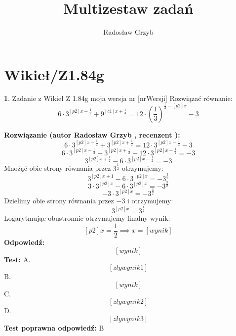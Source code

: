 \documentclass[12pt, a4paper]{article}
\title{Multizestaw zadań}
\author{Radosław Grzyb}
\date{}
\theoremstyle{definition} %
\newtheorem{zad}{}
\newcommand{\kategoria}[1]{\section{#1}} %
\newcommand{\zadStart}[1]{\begin{zad}#1\newline} %
\newcommand{\zadStop}{\end{zad}}   %
\newcommand{\rozwStart}[2]{\noindent \textbf{Rozwiązanie (autor #1 , recenzent #2): }\newline} %
\newcommand{\rozwStop}{\newline}                                            %
\newcommand{\odpStart}{\noindent \textbf{Odpowiedź:}\newline}    %
\newcommand{\odpStop}{\newline}                                             %
\newcommand{\testStart}{\noindent \textbf{Test:}\newline} %
\newcommand{\testStop}{\newline} %
\newcommand{\kluczStart}{\noindent \textbf{Test poprawna odpowiedź:}\newline} %
\newcommand{\kluczStop}{\newline} %
\begin{document}
\maketitle
\kategoria{Wikieł/Z1.84g}
\zadStart{Zadanie z Wikieł Z 1.84g moja wersja nr [nrWersji]}
Rozwiązać równanie:
$$6\cdot3^{[p2]x-\frac{1}{2}}+9^{[c1]x+\frac{1}{4}}=12\cdot\left(\frac{1}{3}\right)^{\frac{1}{2}-[p2]x}-3$$
\zadStop
\rozwStart{Radosław Grzyb}{}
$$6\cdot3^{[p2]x-\frac{1}{2}}+3^{[p2]x+\frac{1}{2}}=12\cdot3^{[p2]x-\frac{1}{2}}-3$$
$$6\cdot3^{[p2]x-\frac{1}{2}}+3^{[p2]x+\frac{1}{2}}-12\cdot3^{[p2]x-\frac{1}{2}}=-3$$
$$3^{[p2]x+\frac{1}{2}}-6\cdot3^{[p2]x-\frac{1}{2}}=-3$$
Mnożąć obie strony równania przez $3^{\frac{1}{2}}$ otrzymujemy:
$$3^{[p2]x+1}-6\cdot3^{[p2]x}=-3^{\frac{3}{2}}$$
$$3\cdot3^{[p2]x}-6\cdot3^{[p2]x}=-3^{\frac{3}{2}}$$
$$-3\cdot3^{[p2]x}=-3^{\frac{3}{2}}$$
Dzielimy obie strony równania przez $-3$ i otrzymujemy:
$$3^{[p2]x}=3^{\frac{1}{2}}$$
Logarytmując obustronnie otrzymujemy finalny wynik:
$$[p2]x=\frac{1}{2}\implies x=[wynik]$$
\rozwStop
\odpStart
$$[wynik]$$
\odpStop
\testStart
A.$$[zlywynik1]$$
B.$$[wynik]$$
C.$$[zlywynik2]$$
D.$$[zlywynik3]$$
\testStop
\kluczStart
B
\kluczStop
\end{document}
